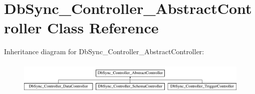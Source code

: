 \hypertarget{classDbSync__Controller__AbstractController}{
\section{DbSync\_\-Controller\_\-AbstractController Class Reference}
\label{classDbSync__Controller__AbstractController}
}
Inheritance diagram for DbSync\_\-Controller\_\-AbstractController:\begin{figure}[H]
\begin{center}
\leavevmode
\includegraphics[height=1.568627cm]{classDbSync__Controller__AbstractController}
\end{center}
\end{figure}
